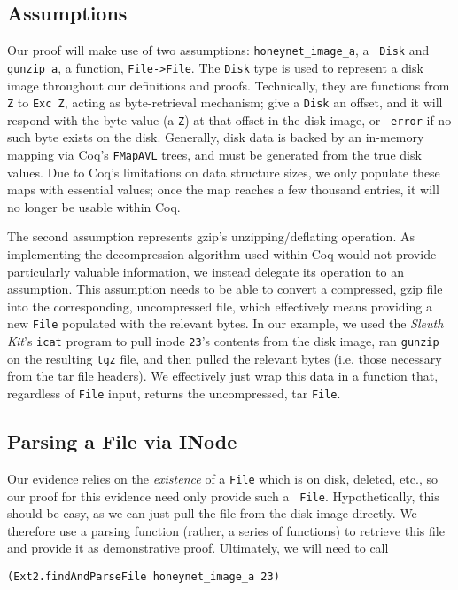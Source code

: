 \documentclass[nocopyrightspace]{sigplanconf}
\begin{document}
\subsection{Assumptions}
Our proof will make use of two assumptions: {\tt honeynet\_image\_a}, a {\tt
Disk} and {\tt gunzip\_a}, a function, {\tt File->File}. The {\tt Disk} type
is used to represent a disk image throughout our definitions and proofs.
Technically, they are functions from {\tt Z} to {\tt Exc Z}, acting as
byte-retrieval mechanism; give a {\tt Disk} an offset, and it will respond
with the byte value (a {\tt Z}) at that offset in the disk image, or {\tt
error} if no such byte exists on the disk. Generally, disk data is backed by
an in-memory mapping via Coq's {\tt FMapAVL} trees, and must be generated from
the true disk values. Due to Coq's limitations on data structure sizes, we
only populate these maps with essential values; once the map reaches a few
thousand entries, it will no longer be usable within Coq.

The second assumption represents gzip's unzipping/deflating operation. As
implementing the decompression algorithm used within Coq would not provide
particularly valuable information, we instead delegate its operation to an
assumption. This assumption needs to be able to convert a compressed, gzip
file into the corresponding, uncompressed file, which effectively means
providing a new {\tt File} populated with the relevant bytes. In our example,
we used the {\it Sleuth Kit}'s {\tt icat} program to pull inode {\tt 23}'s
contents from the disk image, ran {\tt gunzip} on the resulting {\tt tgz}
file, and then pulled the relevant bytes (i.e. those necessary from the tar
file headers). We effectively just wrap this data in a function that,
regardless of {\tt File} input, returns the uncompressed, tar {\tt File}.


\subsection{Parsing a File via INode}

Our evidence relies on the {\it existence} of a {\tt File} which is on disk,
deleted, etc., so our proof for this evidence need only provide such a {\tt
File}. Hypothetically, this should be easy, as we can just pull the file from
the disk image directly. We therefore use a parsing function (rather, a series
of functions) to retrieve this file and provide it as demonstrative proof.
Ultimately, we will need to call

\begin{lstlisting}
(Ext2.findAndParseFile honeynet_image_a 23)
\end{lstlisting}
\end{document}
